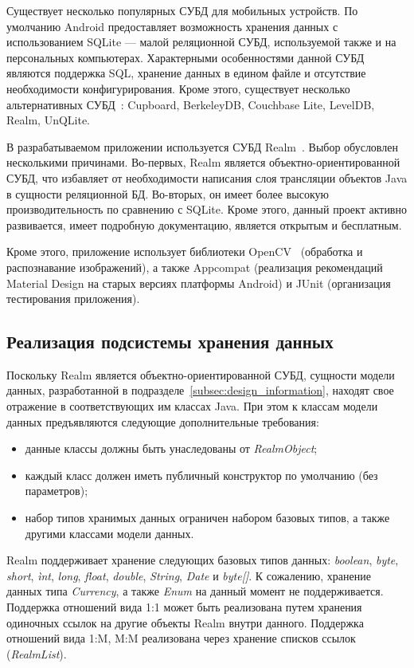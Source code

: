 Существует несколько популярных СУБД для мобильных устройств.
По умолчанию Android предоставляет возможность хранения
данных с использованием SQLite --- малой реляционной СУБД,
используемой также и на персональных компьютерах.
Характерными особенностями данной СУБД являются поддержка SQL,
хранение данных в едином файле и отсутствие необходимости конфигурирования.
Кроме этого, существует несколько альтернативных СУБД~\cite{mobile_db}:
Cupboard, BerkeleyDB, Couchbase Lite, LevelDB, Realm, UnQLite.

В разрабатываемом приложении используется СУБД Realm~\cite{realm_official}.
Выбор обусловлен несколькими причинами.
Во-первых, Realm является объектно-ориентированной СУБД,
что избавляет от необходимости написания слоя трансляции объектов Java
в сущности реляционной БД.
Во-вторых, он имеет более высокую производительность по сравнению с SQLite.
Кроме этого, данный проект активно развивается, имеет подробную документацию,
является открытым и бесплатным.

Кроме этого, приложение использует библиотеки OpenCV~\cite{opencv}
(обработка и распознавание изображений),
а также Appcompat (реализация рекомендаций Material Design на старых версиях платформы Android)
и JUnit (организация тестирования приложения).

\subsection{Реализация подсистемы хранения данных}
\label{subsec:implementation_db}

Поскольку Realm является объектно-ориентированной СУБД,
сущности модели данных, разработанной в подразделе~\ref{subsec:design_information},
находят свое отражение в соответствующих им классах Java.
При этом к классам модели данных предъявляются следующие дополнительные требования:
\begin{itemize}
  \item данные классы должны быть унаследованы от \textit{RealmObject};
  \item каждый класс должен иметь публичный конструктор по умолчанию (без параметров);
  \item набор типов хранимых данных ограничен набором базовых типов,
    а также другими классами модели данных.
\end{itemize}

Realm поддерживает хранение следующих базовых типов данных:
\textit{boolean}, \textit{byte}, \textit{short}, \textit{ìnt},
\textit{long}, \textit{float}, \textit{double}, \textit{String},
\textit{Date} и \textit{byte[]}.
К сожалению, хранение данных типа \textit{Currency}, а также
\textit{Enum} на данный момент не поддерживается.
Поддержка отношений вида 1:1 может быть реализована
путем хранения одиночных ссылок на другие объекты Realm внутри данного.
Поддержка отношений вида 1:M, M:M
реализована через хранение списков ссылок (\textit{RealmList}).

